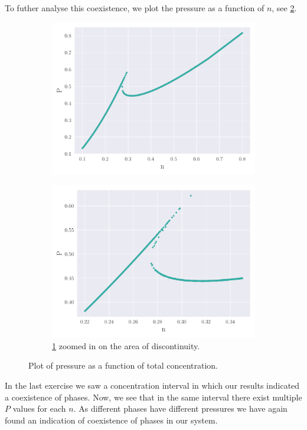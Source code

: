     To futher analyse this coexistence, we plot the pressure as a function of $n$, see \cref{fig:n_vs_P}. 
    \begin{figure}
        \centering 
        \begin{subfigure}[b]{0.49\textwidth}
            \includegraphics[width=\textwidth]{./figs/n_vs_P.pdf}
            \caption{}
            \label{fig:n_vs_P_a}
        \end{subfigure}
        \begin{subfigure}[b]{0.49\textwidth}
            \includegraphics[width=\textwidth]{./figs/n_vs_P_zoom.pdf}
            \caption{\cref{fig:n_vs_P_a} zoomed in on the area of discontinuity.}
        \end{subfigure}
        \caption{Plot of pressure as a function of total concentration.}
        \label{fig:n_vs_P}
    \end{figure}
    In the last exercise we saw a concentration interval in which our results indicated a coexistence of phases. Now, we see that in the same interval there exist multiple $P$ values for each $n$. As different phases have different pressures we have again found an indication of coexistence of phases in our system. 



